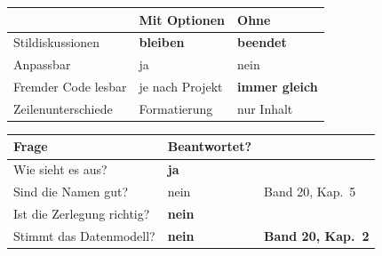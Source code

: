 \begin{merksatz}
\begin{center}
\renewcommand{\arraystretch}{1.5}
\begin{tabular}{@{}P{3.4cm}P{2.4cm}P{2.4cm}@{}}
\toprule
& \textbf{Mit Optionen} & \textbf{Ohne}\\
\midrule
Stildiskussionen & \textcolor{akzent}{\textbf{bleiben}} & \textcolor{gruen}{\textbf{beendet}}\\
Anpassbar & \textcolor{gruen}{ja} & \textcolor{akzent}{nein}\\
Fremder Code lesbar & \textcolor{mittel}{je nach Projekt} & \textcolor{gruen}{\textbf{immer gleich}}\\
Zeilenunterschiede & \textcolor{akzent}{Formatierung} & \textcolor{gruen}{nur Inhalt}\\
\bottomrule
\end{tabular}
\end{center}

\begin{center}
\begin{minipage}{0.88\textwidth}
\end{minipage}
\end{center}

\begin{center}
\end{center}

\begin{warnung}
\begin{center}
\renewcommand{\arraystretch}{1.5}
\begin{tabular}{@{}P{3.4cm}P{2.4cm}P{2.4cm}@{}}
\toprule
\textbf{Frage} & \textbf{Beantwortet?} & \\
\midrule
Wie sieht es aus? & \textcolor{gruen}{\textbf{ja}} & \\
Sind die Namen gut? & \textcolor{akzent}{nein} & Band 20, Kap.~5\\
Ist die Zerlegung richtig? & \textcolor{akzent}{\textbf{nein}} & \\
Stimmt das Datenmodell? & \textcolor{akzent}{\textbf{nein}} & \textbf{Band 20, Kap.~2}\\
\bottomrule
\end{tabular}
\end{center}


\end{warnung}
\end{merksatz}
